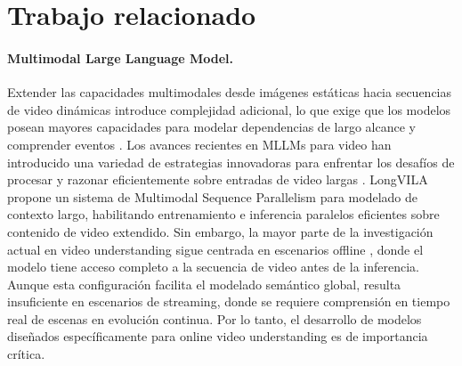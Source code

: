 \section{Trabajo relacionado}
\label{sec:Related_work}


\paragraph{Multimodal Large Language Model.} Extender las capacidades multimodales desde imágenes estáticas hacia secuencias de video dinámicas introduce complejidad adicional, lo que exige que los modelos posean mayores capacidades para modelar dependencias de largo alcance y comprender eventos \cite{li2023videochat,liu2024kangaroo,zohar2024apollo,liu2024nvila,zhang2025videollama3,internvideo2}. Los avances recientes en MLLMs para video han introducido una variedad de estrategias innovadoras para enfrentar los desafíos de procesar y razonar eficientemente sobre entradas de video largas \cite{lin2023videollava,liu2024oryx,li2025llavast,shu2024videoxl,li2024videochatflash}. LongVILA \cite{chen2024longvila} propone un sistema de Multimodal Sequence Parallelism para modelado de contexto largo, habilitando entrenamiento e inferencia paralelos eficientes sobre contenido de video extendido. Sin embargo, la mayor parte de la investigación actual en video understanding sigue centrada en escenarios offline \cite{wang2024longllava,zeng2024timesuite,yan2024tpo,li2025videochatr1}, donde el modelo tiene acceso completo a la secuencia de video antes de la inferencia. Aunque esta configuración facilita el modelado semántico global, resulta insuficiente en escenarios de streaming, donde se requiere comprensión en tiempo real de escenas en evolución continua. Por lo tanto, el desarrollo de modelos diseñados específicamente para online video understanding es de importancia crítica.



